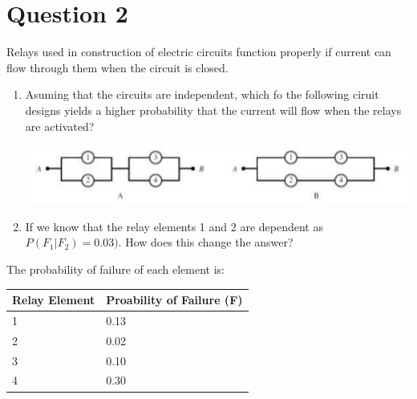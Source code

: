 \documentclass[13pt]{article}
\begin{document}
\section*{Question 2}
Relays used in construction of electric circuits function properly if
current can flow through them when the circuit is closed.
\begin{enumerate}[label=\textbf{\alph*.}]
\item Asuming that the circuits are independent, which fo the
  following ciruit designs yields a higher probability that the
  current will flow when the relays are activated?
  \begin{center}
    \includegraphics[scale=0.25]{images/circuits.png}
  \end{center}

\item If we know that the relay elements 1 and 2 are dependent as
  $P(F_1|F_2) = 0.03)$. How does this change the answer?
\end{enumerate}
The probability of failure of each element is:
\begin{center}
  \begin{tabular}{|l|l|}
    \hline
    \textbf{Relay Element} & \textbf{Proability of Failure (F)} \\
    \hline
    1 & 0.13 \\ \hline
    2 & 0.02 \\ \hline
    3 & 0.10 \\ \hline
    4 & 0.30 \\
    \hline
  \end{tabular}
\end{center}
\end{document}
